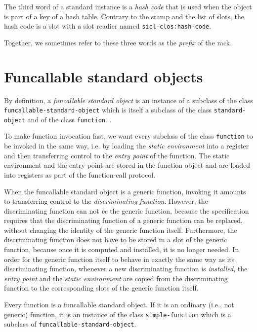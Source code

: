The third word of a standard instance is a \emph{hash code} that is
used when the object is part of a key of a hash table.  Contrary to
the stamp and the list of slots, the hash code is a slot with a slot
readier named \texttt{sicl-clos:hash-code}.

Together, we sometimes refer to these three words as the \emph{prefix}
of the rack.

\section{Funcallable standard objects}
\label{sec-data-representation-funcallable-standard-objects}

By definition, a \emph{funcallable standard object} is an instance of
a subclass of the class \texttt{funcallable-standard-object} which is
itself a subclass of the class \texttt{standard-object} and of the
class \texttt{function}. .

To make function invocation fast, we want every subclass of the class
\texttt{function} to be invoked in the same way, i.e. by loading the
\emph{static environment} into a register and then transferring
control to the \emph{entry point} of the function. The static
environment and the entry point are stored in the function object
and are loaded into registers as part of the function-call protocol.

When the funcallable standard object is a generic function, invoking
it amounts to transferring control to the \emph{discriminating
  function}.  However, the discriminating function can not \emph{be}
the generic function, because the \clos{} specification requires that
the discriminating function of a generic function can be replaced,
without changing the identity of the generic function itself.
Furthermore, the discriminating function does not have to be stored in
a slot of the generic function, because once it is computed and
installed, it is no longer needed.  In order for the generic function
itself to behave in exactly the same way as its discriminating
function, whenever a new discriminating function is \emph{installed},
the \emph{entry point} and the \emph{static environment} are copied
from the discriminating function to the corresponding slots of the
generic function itself.

Every \sysname{} function is a funcallable standard object.  If it is
an ordinary (i.e., not generic) function, it is an instance of the
class \texttt{simple-function} which is a subclass of
\texttt{funcallable-standard-object}.

